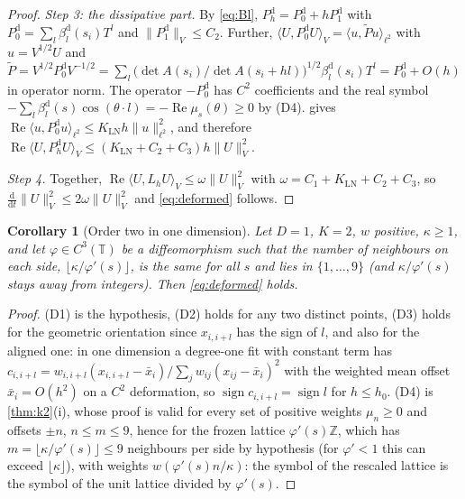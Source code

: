 \documentclass[11pt,a4paper]{article}
\theoremstyle{plain}
\newtheorem{corollary}[theorem]{Corollary}
\theoremstyle{definition}
\theoremstyle{remark}
\numberwithin{equation}{section}
\newcommand{\Z}{\mathbb{Z}}
\newcommand{\T}{\mathbb{T}}
\newcommand{\dd}{\mathrm{d}}
\newcommand{\sgn}{\operatorname{sign}}
\renewcommand{\Re}{\operatorname{Re}}
\begin{document}
\begin{proof}
\emph{Step 3: the dissipative part.} By \eqref{eq:Bl}, $P^{\mathrm d}_h=P^{\mathrm d}_0+hP^{\mathrm d}_1$ with $P^{\mathrm d}_0=\sum_l\beta^{\mathrm d}_l(s_i)T^l$ and $\|P^{\mathrm d}_1\|_V\le C_2$. Further, $\langle U,P^{\mathrm d}_0U\rangle_V=\langle u,\tilde P u\rangle_{\ell^2}$ with $u=V^{1/2}U$ and $\tilde P=V^{1/2}P^{\mathrm d}_0V^{-1/2}=\sum_l\big(\det A(s_i)/\det A(s_i+hl)\big)^{1/2}\beta^{\mathrm d}_l(s_i)T^l=P^{\mathrm d}_0+O(h)$ in operator norm. The operator $-P^{\mathrm d}_0$ has $C^2$ coefficients and the real symbol $-\sum_l\beta^{\mathrm d}_l(s)\cos(\theta\cdot l)=-\Re\mu_s(\theta)\ge0$ by (D4).  gives $\Re\langle u,P^{\mathrm d}_0u\rangle_{\ell^2}\le K_{\mathrm{LN}}h\|u\|^2_{\ell^2}$, and therefore $\Re\langle U,P^{\mathrm d}_hU\rangle_V\le(K_{\mathrm{LN}}+C_2+C_3)h\|U\|_V^2$.

\emph{Step 4.} Together, $\Re\langle U,L_hU\rangle_V\le\omega\|U\|_V^2$ with $\omega=C_1+K_{\mathrm{LN}}+C_2+C_3$, so $\frac{\dd}{\dd t}\|U\|_V^2\le2\omega\|U\|_V^2$ and \eqref{eq:deformed} follows.
\end{proof}

\begin{corollary}[Order two in one dimension]\label{cor:k2deformed}
Let $D=1$, $K=2$, $w$ positive, $\kappa\ge1$, and let $\varphi\in C^3(\T)$ be a diffeomorphism such that the number of neighbours on each side, $\lfloor\kappa/\varphi'(s)\rfloor$, is the same for all $s$ and lies in $\{1,\dots,9\}$ (and $\kappa/\varphi'(s)$ stays away from integers). Then \eqref{eq:deformed} holds.
\end{corollary}

\begin{proof}
(D1) is the hypothesis, (D2) holds for any two distinct points, (D3) holds for the geometric orientation since $x_{i,i+l}$ has the sign of $l$, and also for the aligned one: in one dimension a degree-one fit with constant term has $c_{i,i+l}=w_{i,i+l}(x_{i,i+l}-\bar x_i)/\sum_jw_{ij}(x_{ij}-\bar x_i)^2$ with the weighted mean offset $\bar x_i=O(h^2)$ on a $C^2$ deformation, so $\sgn c_{i,i+l}=\sgn l$ for $h\le h_0$. (D4) is \cref{thm:k2}(i), whose proof is valid for every set of positive weights $\mu_n\ge0$ and offsets $\pm n$, $n\le m\le9$, hence for the frozen lattice $\varphi'(s)\Z$, which has $m=\lfloor\kappa/\varphi'(s)\rfloor\le9$ neighbours per side by hypothesis (for $\varphi'<1$ this can exceed $\lfloor\kappa\rfloor$), with weights $w(\varphi'(s)n/\kappa)$: the symbol of the rescaled lattice is the symbol of the unit lattice divided by $\varphi'(s)$.
\end{proof}
\end{document}
